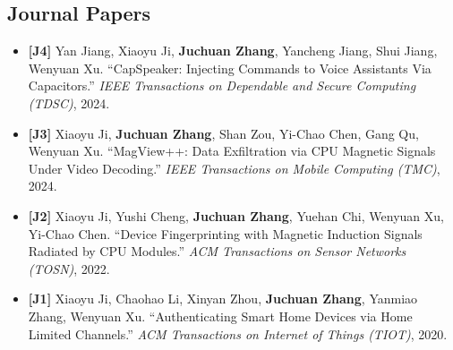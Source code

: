 \documentclass[11pt,a4paper]{article}
\begin{document}
\subsection*{Journal Papers}
\begin{itemize}
  \item \textbf{[J4]} Yan Jiang, Xiaoyu Ji, \textbf{Juchuan Zhang}, Yancheng Jiang, Shui Jiang, Wenyuan Xu.
  ``CapSpeaker: Injecting Commands to Voice Assistants Via Capacitors.''
  \emph{IEEE Transactions on Dependable and Secure Computing (TDSC)}, 2024.

  \item \textbf{[J3]} Xiaoyu Ji, \textbf{Juchuan Zhang}, Shan Zou, Yi-Chao Chen, Gang Qu, Wenyuan Xu.
  ``MagView++: Data Exfiltration via CPU Magnetic Signals Under Video Decoding.''
  \emph{IEEE Transactions on Mobile Computing (TMC)}, 2024.

  \item \textbf{[J2]} Xiaoyu Ji, Yushi Cheng, \textbf{Juchuan Zhang}, Yuehan Chi, Wenyuan Xu, Yi-Chao Chen.
  ``Device Fingerprinting with Magnetic Induction Signals Radiated by CPU Modules.''
  \emph{ACM Transactions on Sensor Networks (TOSN)}, 2022.

  \item \textbf{[J1]} Xiaoyu Ji, Chaohao Li, Xinyan Zhou, \textbf{Juchuan Zhang}, Yanmiao Zhang, Wenyuan Xu.
  ``Authenticating Smart Home Devices via Home Limited Channels.''
  \emph{ACM Transactions on Internet of Things (TIOT)}, 2020.
\end{itemize}
\end{document}
